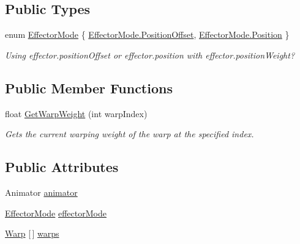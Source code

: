 \subsection*{Public Types}
\begin{DoxyCompactItemize}
\item 
enum \mbox{\hyperlink{class_root_motion_1_1_demos_1_1_animation_warping_a123d7f3cfdbea0d8a48c0d4e0e36a155}{Effector\+Mode}} \{ \mbox{\hyperlink{class_root_motion_1_1_demos_1_1_animation_warping_a123d7f3cfdbea0d8a48c0d4e0e36a155a6def4b21a10fbf438bd93e1d6e24a195}{Effector\+Mode.\+Position\+Offset}}, 
\mbox{\hyperlink{class_root_motion_1_1_demos_1_1_animation_warping_a123d7f3cfdbea0d8a48c0d4e0e36a155a52f5e0bc3859bc5f5e25130b6c7e8881}{Effector\+Mode.\+Position}}
 \}
\begin{DoxyCompactList}\small\item\em Using effector.\+position\+Offset or effector.\+position with effector.\+position\+Weight? \end{DoxyCompactList}\end{DoxyCompactItemize}
\subsection*{Public Member Functions}
\begin{DoxyCompactItemize}
\item 
float \mbox{\hyperlink{class_root_motion_1_1_demos_1_1_animation_warping_a4f658892face38fd94d60ba335d64eb5}{Get\+Warp\+Weight}} (int warp\+Index)
\begin{DoxyCompactList}\small\item\em Gets the current warping weight of the warp at the specified index. \end{DoxyCompactList}\end{DoxyCompactItemize}
\subsection*{Public Attributes}
\begin{DoxyCompactItemize}
\item 
Animator \mbox{\hyperlink{class_root_motion_1_1_demos_1_1_animation_warping_a5edb4d00881529f02f3d3a1762623faf}{animator}}
\item 
\mbox{\hyperlink{class_root_motion_1_1_demos_1_1_animation_warping_a123d7f3cfdbea0d8a48c0d4e0e36a155}{Effector\+Mode}} \mbox{\hyperlink{class_root_motion_1_1_demos_1_1_animation_warping_a160f79a0790fd5c05990de76009e886e}{effector\+Mode}}
\item 
\mbox{\hyperlink{struct_root_motion_1_1_demos_1_1_animation_warping_1_1_warp}{Warp}} \mbox{[}$\,$\mbox{]} \mbox{\hyperlink{class_root_motion_1_1_demos_1_1_animation_warping_a30d3516c1cfcca70655566cfa0fa1e1d}{warps}}
\end{DoxyCompactItemize}
